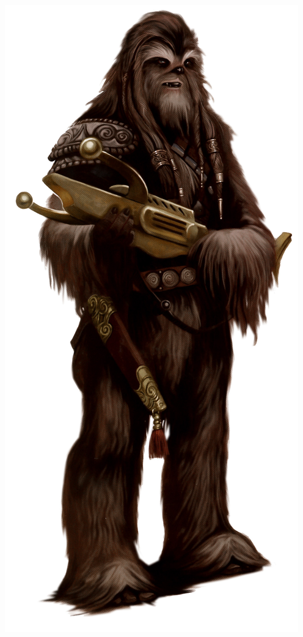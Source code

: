 \documentclass[twoside]{article}
\begin{document}
\noindent\begin{minipage}{0.3\textwidth}
	\includegraphics[width=1\linewidth]{../_img/species/wookie}
\end{minipage}%
\end{document}
